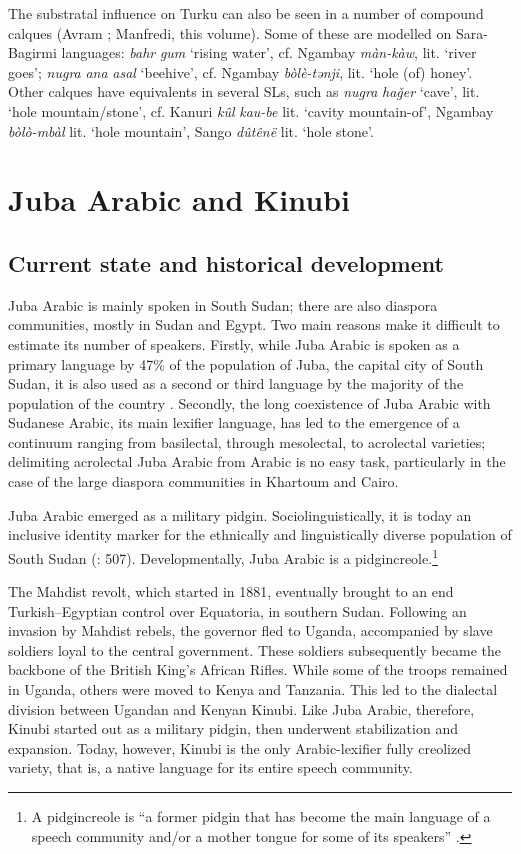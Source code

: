 \documentclass[output=paper]{langsci/langscibook}
\begin{document}
  The substratal influence on Turku can also be seen in a number of compound calques (Avram \citeyear{Avram2019}; Manfredi, this volume). Some of these are modelled on Sara-Bagirmi languages: \textit{bahr} \textit{gum} ‘rising water’, cf. Ngambay \textit{màn-kà}\textit{w}, lit. ‘river goes’; \textit{nugra} \textit{ana} \textit{asal} ‘beehive’, cf. Ngambay \textit{bòlè-tǝnji}, lit. ‘hole (of) honey’. Other calques have equivalents in several SLs, such as \textit{nugra} \textit{haǧer} ‘cave’, lit. ‘hole mountain/stone’, cf. Kanuri \textit{kûl} \textit{kau-be} lit. ‘cavity mountain-of’, Ngambay \textit{bòlò-mbàl} lit. ‘hole mountain’, Sango \textit{dûtênë} lit. ‘hole stone’.


 \section{Juba Arabic and Kinubi}\label{sec:jub}


 \subsection{Current state and historical development}


Juba Arabic is mainly spoken in South Sudan; there are also diaspora communities, mostly in Sudan and Egypt. Two main reasons make it difficult to estimate its number of speakers. Firstly, while Juba Arabic is spoken as a primary language by 47\% of the population of Juba, the capital city of South Sudan, it is also used as a second or third language by the majority of the population of the country \citep[7]{Manfredi2017}. Secondly, the long coexistence of Juba Arabic with Sudanese Arabic, its main lexifier language, has led to the emergence of a continuum ranging from basilectal, through mesolectal, to acrolectal varieties; delimiting acrolectal Juba Arabic from Arabic is no easy task, particularly in the case of the large diaspora communities in Khartoum and Cairo.

  Juba Arabic emerged as a military pidgin. Sociolinguistically, it is today an inclusive identity marker for the ethnically and linguistically diverse population of South Sudan (\citealt{ToscoManfredi2013}: 507). Developmentally, Juba Arabic is a pidgincreole.\footnote{A pidgincreole is “a former pidgin that has become the main language of a speech community and/or a mother tongue for some of its speakers” \citep[131]{Bakker2008}.}

The Mahdist revolt, which started in 1881, eventually brought to an end Turkish--Egyptian control over Equatoria, in southern Sudan. Following an invasion by Mahdist rebels, the governor fled to Uganda, accompanied by slave soldiers loyal to the central government. These soldiers subsequently became the backbone of the British King’s African Rifles. While some of the troops remained in Uganda, others were moved to Kenya and Tanzania. This led to the dialectal division between Ugandan and Kenyan Kinubi. Like Juba Arabic, therefore, Kinubi started out as a military pidgin, then underwent stabilization and expansion. Today, however, Kinubi is the only Arabic-lexifier fully creolized variety, that is, a native language for its entire speech community.
\end{document}
